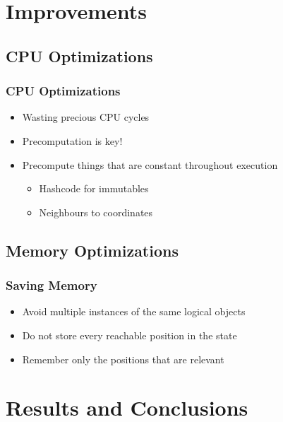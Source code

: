 \documentclass[]{beamer}
\begin{document}
\section{Improvements}
\subsection{CPU Optimizations}

\begin{frame}
	\frametitle{CPU Optimizations}
	\begin{itemize}
		\item{Wasting precious CPU cycles}
		\item{Precomputation is key!}
		\item{Precompute things that are constant throughout execution
			\begin{itemize}
				\item{Hashcode for immutables}
				\item{Neighbours to coordinates}
			\end{itemize}
		}
	\end{itemize}
\end{frame}

\subsection{Memory Optimizations}

\begin{frame}
	\frametitle{Saving Memory}
	\begin{itemize}
		\item{Avoid multiple instances of the same logical objects}
		\item{Do not store every reachable position in the state}
		\item{Remember only the positions that are relevant}
	\end{itemize}
\end{frame}

\section{Results and Conclusions}
\end{document}
